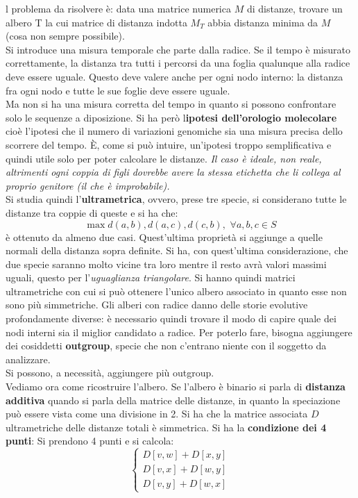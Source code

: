 \documentclass[a4paper,12pt, oneside]{book}
\begin{document}
l problema da risolvere è: data una matrice numerica $M$ di distanze,
trovare un albero T la cui matrice di distanza indotta $M_T$ abbia
distanza minima da $M$ (cosa non sempre possibile).\\
Si introduce una misura temporale che parte dalla radice. Se il tempo
è misurato correttamente, la distanza tra tutti i percorsi da una foglia
qualunque alla radice deve essere uguale. Questo deve valere anche per
ogni nodo interno: la distanza fra ogni nodo e tutte le sue foglie
deve essere uguale.\\
Ma non si ha una misura corretta del tempo in quanto si possono
confrontare solo le sequenze a diposizione. Si ha però
l\textbf{ipotesi dell'orologio molecolare} cioè l’ipotesi che il
numero di variazioni genomiche sia una 
misura precisa dello scorrere del tempo. È, come si può intuire,
un'ipotesi troppo semplificativa e quindi utile solo per poter
calcolare le distanze. \textit{Il caso è ideale, non reale, altrimenti
  ogni coppia di figli dovrebbe avere la stessa etichetta che li
  collega al proprio genitore (il che è improbabile).} \\
Si studia quindi l'\textbf{ultrametrica}, ovvero, prese tre specie, si
considerano tutte le distanze tra coppie di queste e si ha che:
\[\max{d(a,b),d(a,c),d(c,b)},\,\,\forall a,b,c\in S\]
è ottenuto da almeno due casi. Quest'ultima proprietà si aggiunge a
quelle normali della distanza sopra definite. Si ha, con quest'ultima
considerazione, che due specie saranno molto vicine tra loro mentre il
resto avrà valori massimi uguali, questo per l'\textit{uguaglianza
  triangolare}. Si hanno quindi matrici ultrametriche con cui si può
ottenere l'unico albero associato in quanto esse non sono più
simmetriche. Gli alberi con radice danno delle storie evolutive
profondamente diverse: è necessario quindi trovare il modo di capire
quale dei nodi interni sia il miglior candidato a radice. Per poterlo
fare, bisogna aggiungere dei cosiddetti \textbf{outgroup}, specie che non
c’entrano niente con il soggetto da analizzare. \\
Si possono, a necessità, aggiungere più outgroup.\\
Vediamo ora come ricostruire l'albero. Se l'albero è binario si parla
di \textbf{distanza additiva} quando si parla della matrice delle
distanze, in quanto la speciazione può essere vista come una divisione
in 2. Si ha che la matrice associata $D$ ultrametriche delle distanze
totali è simmetrica.  
Si ha la \textbf{condizione dei 4 punti}:
Si prendono 4 punti e si calcola:
\[
  \begin{cases}
    D[v,w]+D[x,y]\\
    D[v,x]+D[w,y]\\
    D[v,y]+D[w,x]
  \end{cases}
\]
\end{document}
